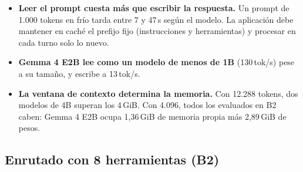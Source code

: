 \documentclass[11pt,a4paper]{article}
\begin{document}
\begin{itemize}
\item \textbf{Leer el prompt cuesta más que escribir la respuesta.} Un prompt de 1.000 tokens en frío tarda entre 7 y 47\,s según el modelo. La aplicación debe mantener en caché el prefijo fijo (instrucciones y herramientas) y procesar en cada turno solo lo nuevo.
\item \textbf{Gemma 4 E2B lee como un modelo de menos de 1B} (130\,tok/s) pese a su tamaño, y escribe a 13\,tok/s.
\item \textbf{La ventana de contexto determina la memoria.} Con 12.288 tokens, dos modelos de 4B superan los 4\,GiB. Con 4.096, todos los evaluados en B2 caben: Gemma 4 E2B ocupa 1,36\,GiB de memoria propia más 2,89\,GiB de pesos.
\end{itemize}

\subsection{Enrutado con 8 herramientas (B2)}
\end{document}
